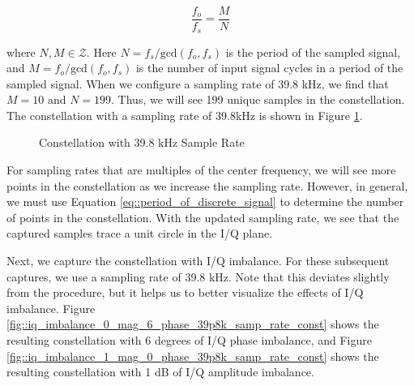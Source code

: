\documentclass{article}
\begin{document}
\begin{equation}
	\frac{f_o}{f_s} = \frac{M}{N} \label{eq::period_of_discrete_signal}
\end{equation}

where $N, M \in \mathcal{Z}$. Here $N=f_s/\text{gcd}(f_o,f_s)$ is the period of the sampled signal, and $M=f_o/\text{gcd}(f_o,f_s)$ is the number of input signal cycles in a period of the sampled signal. When we configure a sampling rate of 39.8 kHz, we find that $M=10$ and $N=199$. Thus, we will see 199 unique samples in the constellation. The constellation with a sampling rate of 39.8kHz is shown in Figure \ref{fig::iq_imbalance_0_mag_0_phase_39p8k_samp_rate_const}.

\begin{figure}[H]
	\centerline{}
	\caption{Constellation with 39.8 kHz Sample Rate}
	\label{fig::iq_imbalance_0_mag_0_phase_39p8k_samp_rate_const}
\end{figure}

For sampling rates that are multiples of the center frequency, we will see more points in the constellation as we increase the sampling rate. However, in general, we must use Equation \ref{eq::period_of_discrete_signal} to determine the number of points in the constellation. With the updated sampling rate, we see that the captured samples trace a unit circle in the I/Q plane.

Next, we capture the constellation with I/Q imbalance. For these subsequent captures, we use a sampling rate of 39.8 kHz. Note that this deviates slightly from the procedure, but it helps us to better visualize the effects of I/Q imbalance. Figure \ref{fig::iq_imbalance_0_mag_6_phase_39p8k_samp_rate_const} shows the resulting constellation with 6 degrees of I/Q phase imbalance, and Figure \ref{fig::iq_imbalance_1_mag_0_phase_39p8k_samp_rate_const} shows the resulting constellation with 1 dB of I/Q amplitude imbalance.
\end{document}
